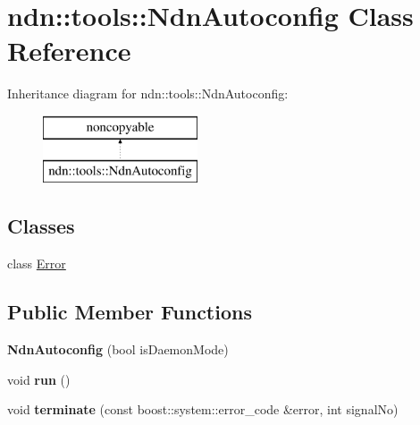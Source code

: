 \hypertarget{classndn_1_1tools_1_1NdnAutoconfig}{}\section{ndn\+:\+:tools\+:\+:Ndn\+Autoconfig Class Reference}
\label{classndn_1_1tools_1_1NdnAutoconfig}
Inheritance diagram for ndn\+:\+:tools\+:\+:Ndn\+Autoconfig\+:\begin{figure}[H]
\begin{center}
\leavevmode
\includegraphics[height=2.000000cm]{classndn_1_1tools_1_1NdnAutoconfig}
\end{center}
\end{figure}
\subsection*{Classes}
\begin{DoxyCompactItemize}
\item 
class \hyperlink{classndn_1_1tools_1_1NdnAutoconfig_1_1Error}{Error}
\end{DoxyCompactItemize}
\subsection*{Public Member Functions}
\begin{DoxyCompactItemize}
\item 
{\bfseries Ndn\+Autoconfig} (bool is\+Daemon\+Mode)\hypertarget{classndn_1_1tools_1_1NdnAutoconfig_a77587fbb2c826bc3f2624d3ce2d6c1b2}{}\label{classndn_1_1tools_1_1NdnAutoconfig_a77587fbb2c826bc3f2624d3ce2d6c1b2}

\item 
void {\bfseries run} ()\hypertarget{classndn_1_1tools_1_1NdnAutoconfig_a756edea2cf118d21e3d468172856c562}{}\label{classndn_1_1tools_1_1NdnAutoconfig_a756edea2cf118d21e3d468172856c562}

\item 
void {\bfseries terminate} (const boost\+::system\+::error\+\_\+code \&error, int signal\+No)\hypertarget{classndn_1_1tools_1_1NdnAutoconfig_a40690ee8864496967d688583a09cc7a6}{}\label{classndn_1_1tools_1_1NdnAutoconfig_a40690ee8864496967d688583a09cc7a6}

\end{DoxyCompactItemize}
